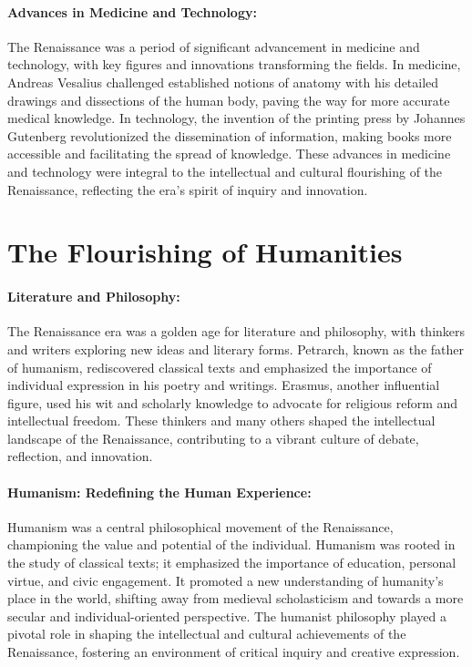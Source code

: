 \documentclass[a4paper,12pt]{book}
\begin{document}
\paragraph{Advances in Medicine and Technology:}
The Renaissance was a period of significant advancement in medicine and technology, with key figures and innovations transforming the fields. In medicine, Andreas Vesalius challenged established notions of anatomy with his detailed drawings and dissections of the human body, paving the way for more accurate medical knowledge. In technology, the invention of the printing press by Johannes Gutenberg revolutionized the dissemination of information, making books more accessible and facilitating the spread of knowledge. These advances in medicine and technology were integral to the intellectual and cultural flourishing of the Renaissance, reflecting the era's spirit of inquiry and innovation.

\section*{The Flourishing of Humanities}

\paragraph{Literature and Philosophy:}
The Renaissance era was a golden age for literature and philosophy, with thinkers and writers exploring new ideas and literary forms. Petrarch, known as the father of humanism, rediscovered classical texts and emphasized the importance of individual expression in his poetry and writings. Erasmus, another influential figure, used his wit and scholarly knowledge to advocate for religious reform and intellectual freedom. These thinkers and many others shaped the intellectual landscape of the Renaissance, contributing to a vibrant culture of debate, reflection, and innovation.

\paragraph{Humanism: Redefining the Human Experience:}
Humanism was a central philosophical movement of the Renaissance, championing the value and potential of the individual. Humanism was rooted in the study of classical texts; it emphasized the importance of education, personal virtue, and civic engagement. It promoted a new understanding of humanity’s place in the world, shifting away from medieval scholasticism and towards a more secular and individual-oriented perspective. The humanist philosophy played a pivotal role in shaping the intellectual and cultural achievements of the Renaissance, fostering an environment of critical inquiry and creative expression.
\end{document}
